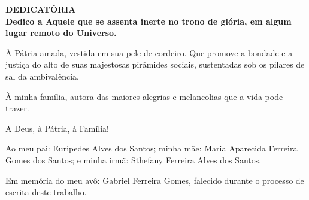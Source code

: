 \documentclass[12pt,a4paper,oneside,brazil]{abntex2}
\newcommand{\grauOrientador}{\acrshort{prof}. \acrshort{mee}.}
\newcommand{\grauBancaUm}{\acrshort{prof}. \acrshort{me}}
\newcommand{\bancaUm}{Miriam Sandra Rosa Gusmão}
\newcommand{\grauBancaDois}{\acrshort{prof}. \acrshort{mee}.}
\newcommand{\bancaDois}{Carlos Alexandre Ferreira de Lima}
\begin{document}








\clearpage

\centering
\ABNTEXchapterfont\bfseries{\textsc{\MakeUppercase{Dedicatória}}}\\
\vspace*{3cm}
\justifying
\normalfont
Dedico a Aquele que se assenta inerte no trono de glória, em algum lugar
remoto do Universo.

À Pátria amada,
vestida em sua pele de cordeiro. Que promove a bondade
e a justiça do alto de suas majestosas pirâmides sociais, sustentadas
sob os pilares de sal da ambivalência.


À minha família, autora das maiores alegrias e melancolias que a
vida pode trazer.

\vspace{10mm}

A Deus, à Pátria, à Família!

\vspace{20mm}

Ao meu pai: Euripedes Alves dos Santos; minha mãe: Maria
Aparecida Ferreira Gomes dos Santos; e minha irmã:
Sthefany Ferreira Alves dos Santos.

\vspace{10mm}

Em memória do meu avô: Gabriel Ferreira Gomes, falecido durante
o processo de escrita deste trabalho.

\vspace{10mm}
\end{document}
